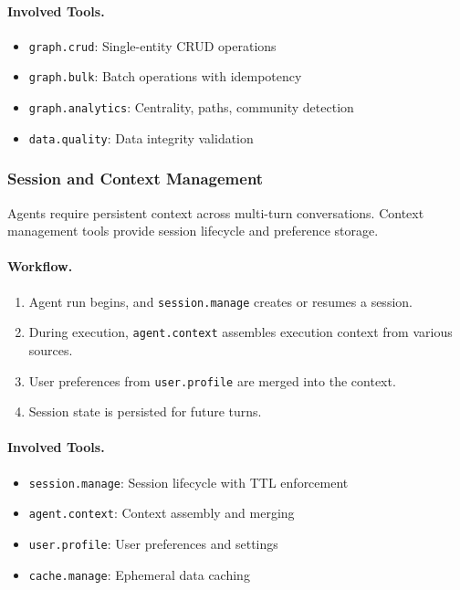 \paragraph{Involved Tools.}
\begin{itemize}
    \item \texttt{graph.crud}: Single-entity CRUD operations
    \item \texttt{graph.bulk}: Batch operations with idempotency
    \item \texttt{graph.analytics}: Centrality, paths, community detection
    \item \texttt{data.quality}: Data integrity validation
\end{itemize}

\subsubsection{Session and Context Management}

Agents require persistent context across multi-turn conversations. Context management tools provide session lifecycle and preference storage.

\paragraph{Workflow.}
\begin{enumerate}
    \item Agent run begins, and \texttt{session.manage} creates or resumes a session.
    \item During execution, \texttt{agent.context} assembles execution context from various sources.
    \item User preferences from \texttt{user.profile} are merged into the context.
    \item Session state is persisted for future turns.
\end{enumerate}

\paragraph{Involved Tools.}
\begin{itemize}
    \item \texttt{session.manage}: Session lifecycle with TTL enforcement
    \item \texttt{agent.context}: Context assembly and merging
    \item \texttt{user.profile}: User preferences and settings
    \item \texttt{cache.manage}: Ephemeral data caching
\end{itemize}

